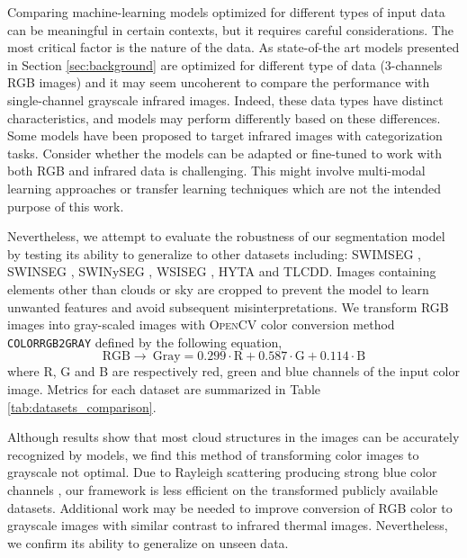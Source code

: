 \documentclass[amt, article]{copernicus}
\begin{document}
Comparing machine-learning models optimized for different types of input data can be meaningful in certain contexts, but it requires careful considerations. The most critical factor is the nature of the data. As state-of-the art models presented in Section \ref{sec:background} are optimized for different type of data (3-channels RGB images) and it may seem uncoherent to compare the performance with single-channel grayscale infrared images. Indeed, these data types have distinct characteristics, and models may perform differently based on these differences.
Some models \cite{SUN2011278, Liu2021, amt-11-5351-2018} have been proposed to target infrared images with categorization tasks. Consider whether the models can be adapted or fine-tuned to work with both RGB and infrared data is challenging. This might involve multi-modal learning approaches \citep{liu2018multimodal, li2020deep, MMST} or transfer learning techniques \citep{manzo2021voting, Wang21, zhou2021novel} which are not the intended purpose of this work.

Nevertheless, we attempt to evaluate the robustness of our segmentation model by testing its ability to generalize to other datasets including: SWIMSEG \citep{dev2016colorbased}, SWINSEG \citep{SWINSEG, dev2017nighttime}, SWINySEG \citep{dev2019cloudsegnet}, WSISEG \citep{SegCloud}, HYTA \citep{HYTA} and TLCDD. Images containing elements other than clouds or sky are cropped to prevent the model to learn unwanted features and avoid subsequent misinterpretations. We transform RGB images into gray-scaled images with \textsc{OpenCV} \citep{OpenCV} color conversion method \texttt{COLOR\textunderscore RGB2GRAY} defined by the following equation,
\begin{equation}
    \text{RGB} \rightarrow \: \text{Gray} = 0.299 \cdot \text{R} + 0.587 \cdot \text{G} + 0.114 \cdot \text{B}
    \label{eq:rgb_to_gray}
\end{equation}
where R, G and B are respectively red, green and blue channels of the input color image.
Metrics for each dataset are summarized in Table \ref{tab:datasets_comparison}.

Although results show that most cloud structures in the images can be
accurately recognized by models, we find this method of transforming color images to grayscale not optimal. Due to Rayleigh scattering producing strong blue color channels \citep{bates1984rayleigh}, our framework is less efficient on the transformed publicly available datasets. Additional work may be needed to improve conversion of RGB color to grayscale images with similar contrast to infrared thermal images. Nevertheless, we confirm its ability to generalize on unseen data.
\end{document}
